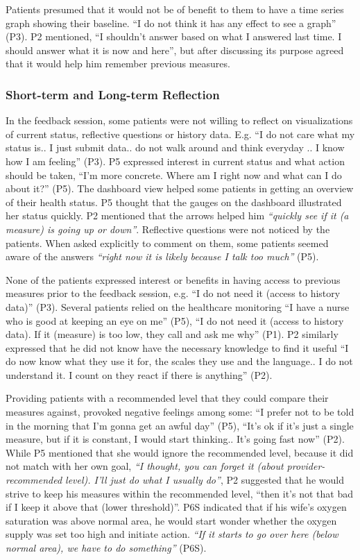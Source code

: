 Patients presumed that it would not be of benefit to them to have a time series graph showing their baseline. “I do not think it has any effect to see a graph” (P3). P2 mentioned, “I shouldn’t answer based on what I answered last time. I should answer what it is now and here”, but after discussing its purpose agreed that it would help him remember previous measures. 

\subsubsection{Short-term and Long-term Reflection}
In the feedback session, some patients were not willing to reflect on visualizations of current status, reflective questions or history data. E.g. “I do not care what my status is.. I just submit data.. do not walk around and think everyday .. I know how I am feeling” (P3). P5 expressed interest in current status and what action should be taken, “I’m more concrete. Where am I right now and what can I do about it?” (P5). The dashboard view helped some patients in getting an overview of their health status. P5 thought that the gauges on the dashboard illustrated her status quickly. P2 mentioned that the arrows helped him \textit{“quickly see if it (a measure) is going up or down”}. Reflective questions were not noticed by the patients. When asked explicitly to comment on them, some patients seemed aware of the answers \textit{“right now it is likely because I talk too much”} (P5). 

None of the patients expressed interest or benefits in having access to previous measures prior to the feedback session, e.g. “I do not need it (access to history data)” (P3). Several patients relied on the healthcare monitoring “I have a nurse who is good at keeping an eye on me” (P5), “I do not need it (access to history data). If it (measure) is too low, they call and ask me why” (P1). P2 similarly expressed that he did not know have the necessary knowledge to find it useful “I do now know what they use it for, the scales they use and the language.. I do not understand it. I count on they react if there is anything” (P2). 

Providing patients with a recommended level that they could compare their measures against, provoked negative feelings among some: “I prefer not to be told in the morning that I’m gonna get an awful day” (P5), “It’s ok if it’s just a single measure, but if it is constant, I would start thinking.. It’s going fast now” (P2). While P5 mentioned that she would ignore the recommended level, because it did not match with her own goal, \textit{“I thought, you can forget it (about provider-recommended level). I’ll just do what I usually do”}, P2 suggested that he would strive to keep his measures within the recommended level, “then it’s not that bad if I keep it above that (lower threshold)”. P6S indicated that if his wife’s oxygen saturation was above normal area, he would start wonder whether the oxygen supply was set too high and initiate action. \textit{“If it starts to go over here (below normal area), we have to do something”} (P6S). 

